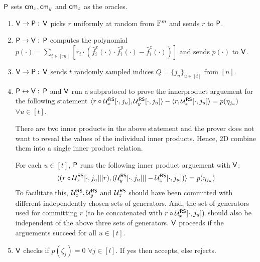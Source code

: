 	$\mathsf{P}$ sets $\mathsf{cm}_x, \mathsf{cm}_y$ and $\mathsf{cm}_z$ as the oracles.
\begin{enumerate}
	\item $\mathsf{V} \rightarrow \mathsf{P}: $ $\mathsf{V}$ picks $r$ uniformly at random from $\mathbb{F}^{m}$ and sends $r$ to $\mathsf{P}$.
	
	\item $\mathsf{P} \rightarrow \mathsf{V}: $ $\mathsf{P}$ computes the polynomial $p(\cdot)= \sum_{i\in [m]} [r_i\cdot (\hat{f}^x_i(\cdot)\cdot \hat{f}^y_i(\cdot) - \hat{f}^z_i(\cdot))] $ and sends $p(\cdot)$ to $\mathsf{V}$. 
	
	\item $\mathsf{V} \rightarrow \mathsf{P}: $ $\mathsf{V}$ sends $t$ randomly sampled indices $Q=\{j_u\}_{u\in[t]}$ from $[n]$.
	
	\item $\mathsf{P} \leftrightarrow \mathsf{V}: $ $\mathsf{P}$ and $\mathsf{V}$ run a subprotocol to prove the innerproduct arguement for the following statement $\langle r\circ \mathcal{U}^{\mathsf{RS}}_x[\cdot,j_u],\mathcal{U}^{\mathsf{RS}}_y[\cdot,j_u]\rangle - \langle r,\mathcal{U}^{\mathsf{RS}}_z[\cdot,j_u]\rangle = p(\eta_{j_u})$ $\forall u\in[t]$. 
	
	There are two inner products in the above statement and the prover does not want to reveal the values of the individual inner products. Hence, \name2D combine them into a single inner product relation.
	
	For each $u\in[t]$, $\mathsf{P}$ runs the following inner product arguement with $\mathsf{V}$:
	$$\langle (r\circ \mathcal{U}^{\mathsf{RS}}_x[\cdot,j_u]||r),(\mathcal{U}^{\mathsf{RS}}_y[\cdot,j_u]||-\mathcal{U}^{\mathsf{RS}}_z[\cdot,j_u])\rangle = p(\eta_{j_u})$$
	To facilitate this, $\mathcal{U}^{\mathsf{RS}}_x, \mathcal{U}^{\mathsf{RS}}_y$ and $\mathcal{U}^{\mathsf{RS}}_z$ should have been committed with different independently chosen sets of generators. And, the set of generators used for committing $r$ (to be concatenated with $r \circ \mathcal{U}^{\mathsf{RS}}_x [\cdot, j_u])$ should also be independent of the above three sets of generators. $\mathsf{V}$ proceeds if the arguements succeed for all $u\in[t]$.
	
	\item $\mathsf{V}$ checks if $p(\zeta_j)=0$ $\forall j\in[l]$. If yes then accepts, else rejects.
\end{enumerate}

